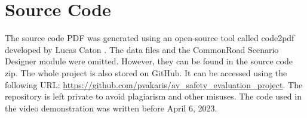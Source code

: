 \chapter{Source Code}

The source code PDF was generated using an open-source tool called code2pdf developed by Lucas Caton \cite{code2pdf}. The data files and the CommonRoad Scenario Designer module were omitted. However, they can be found in the source code zip. The whole project is also stored on GitHub. It can be accessed using the following URL: \url{https://github.com/pvakaris/av\_safety\_evaluation\_project}. The repository is left private to avoid plagiarism and other misuses. The code used in the video demonstration was written before April 6, 2023.


